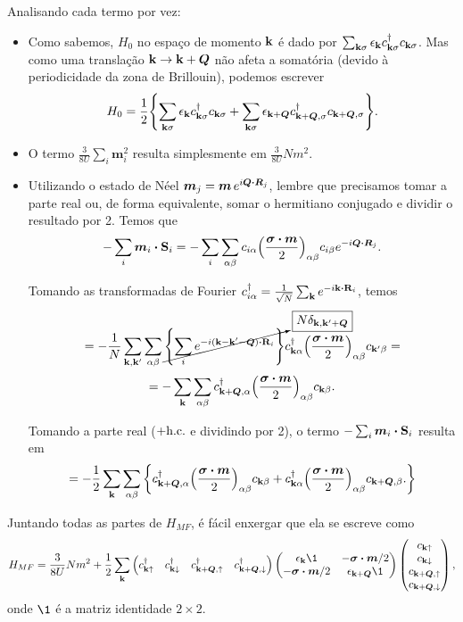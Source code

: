 \documentclass[a4paper,10pt]{article}
\begin{document}
Analisando cada termo por vez:
\begin{itemize}
\item Como sabemos, $H_0$ no espaço de momento $\vb{k}$ é dado por $\sum_{\vb{k}\sigma} \epsilon_{\vb{k}} c_{\vb{k}\sigma}^\dagger c_{\vb{k}\sigma}$. Mas como uma translação $\vb{k} \to \vb{k} + \bm{Q}$ não afeta a somatória (devido à periodicidade da zona de Brillouin), podemos escrever
$$
H_0 = \frac{1}{2}
\qty{
\sum_{\vb{k}\sigma} \epsilon_{\vb{k}} c_{\vb{k}\sigma}^\dagger c_{\vb{k}\sigma} +
\sum_{\vb{k}\sigma} \epsilon_{\vb{k}+\bm{Q}} c_{\vb{k}+\bm{Q},\sigma}^\dagger c_{\vb{k}+\bm{Q},\sigma}
}.
$$

\item O termo $\frac{3}{8U} \sum_{i} \bm{m}_i^2$ resulta simplesmente em $\frac{3}{8U} N m^2$.

\item Utilizando o estado de Néel $\bm{m}_j = \bm{m} \, e^{i \bm{Q} \vdot \bm{R}_j}$, lembre que precisamos tomar a parte real ou, de forma equivalente, somar o hermitiano conjugado e dividir o resultado por 2. Temos que
$$
- \sum_{i} \bm{m}_i \vdot \S_i = -\sum_{i}\sum_{\alpha \beta} c_{i\alpha} \qty(\frac{\bm{\s} \vdot \bm{m}}{2})_{\alpha \beta} c_{i\beta} e^{-i\bm{Q} \vdot \bm{R}_j}.
$$

Tomando as transformadas de Fourier $c_{i\alpha}^\d = \frac{1}{\sqrt{N}} \sum_{\k} e^{-i\k\vdot\R_i}$, temos
$$
= -\frac{1}{N} \sum_{\k,\k'} \sum_{\alpha \beta}
\cancelto{\boxed{N \delta_{\k,\k'+\bm{Q}}}}{\qty{\sum_{i} e^{-i(\k-\k'-\bm{Q})\vdot\R_i}}}
c_{\k\alpha}^\d \qty(\frac{\bm{\s}\vdot\bm{m}}{2})_{\alpha\beta} c_{\k'\beta} =
$$
$$
= - \sum_{\k} \sum_{\alpha \beta}
c_{\k+\bm{Q},\alpha}^\d \qty(\frac{\bm{\s}\vdot\bm{m}}{2})_{\alpha\beta} c_{\k\beta}.
$$


Tomando a parte real ($+ \text{h.c.}$ e dividindo por 2), o termo $-\sum_{i} \bm{m}_i \vdot \S_i$ resulta em
$$
= - \frac{1}{2} \sum_{\k} \sum_{\alpha\beta}
\qty{
c_{\k+\bm{Q},\alpha}^\d \qty(\frac{\bm{\s}\vdot\bm{m}}{2})_{\alpha\beta} c_{\k\beta}+
c_{\k\alpha}^\d \qty(\frac{\bm{\s}\vdot\bm{m}}{2})_{\alpha\beta} c_{\k+\bm{Q},\beta}.
}
$$
\end{itemize}

Juntando todas as partes de $H_{MF}$, é fácil enxergar que ela se escreve como
$$
H_{MF} = \frac{3}{8U} Nm^2 + \frac{1}{2} \sum_{\k}
\begin{pmatrix}
c_{\k\up}^{\d} & c_{\k\down}^{\d} & c_{\k+\bm{Q},\up}^{\d} & c_{\k+\bm{Q},\down}^{\d}
\end{pmatrix}
\begin{pmatrix}
\eps_{\k} \1 & -\bm{\s} \vdot \bm{m}/2 \\
-\bm{\s} \vdot \bm{m}/2 & \eps_{\k+\bm{Q}} \1
\end{pmatrix}
\begin{pmatrix}
c_{\k\up} \\ c_{\k\down} \\ c_{\k+\bm{Q},\up} \\ c_{\k+\bm{Q},\down}
\end{pmatrix},
$$
onde $\1$ é a matriz identidade $2 \times 2$.
\end{document}
